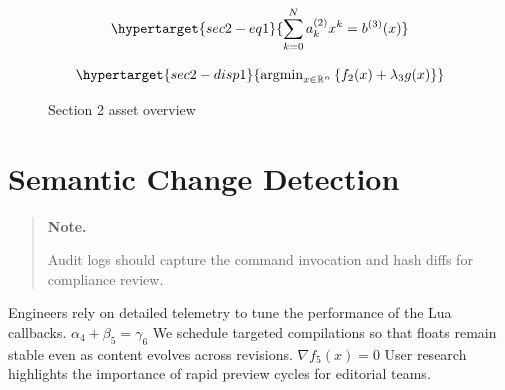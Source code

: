 \documentclass[12pt,a4paper,twocolumn]{article}
\newcommand{\paraid}[1]{\par\noindent\hypertarget{#1}{\ignorespaces}}
\begin{document}
\begin{equation}
\hypertarget{sec2-eq1}{\sum_{k=0}^{N} a_k^{(2)} x^k = b^{(3)}(x)}
\label{eq:sec2-eq1}
\end{equation}

\[
\hypertarget{sec2-disp1}{\operatorname{argmin}_{x \in \mathbb{R}^{n}} \left\{ f_{2}(x) + \lambda_{3} g(x) \right\}}
\]

\begin{figure}[htbp]
\centering
\hypertarget{fig-sec2}{}


\caption{Section 2 asset overview}
\label{fig:fig-sec2}
\hypertarget{fig-sec2-end}{}
\end{figure}


\section{Semantic Change Detection}
\label{sec3}

\begin{quote}
\hypertarget{sec3-note}{\textbf{Note.}} 
      Audit logs should capture the command invocation and hash diffs for compliance review.
    
\end{quote}

\paraid{sec3-p1}Engineers rely on detailed telemetry to tune the performance of the Lua callbacks. $\alpha_{4} + \beta_{5} = \gamma_{6}$ We schedule targeted compilations so that floats remain stable even as content evolves across revisions. $\nabla f_{5}(x) = 0$ User research highlights the importance of rapid preview cycles for editorial teams.
\par
\end{document}
